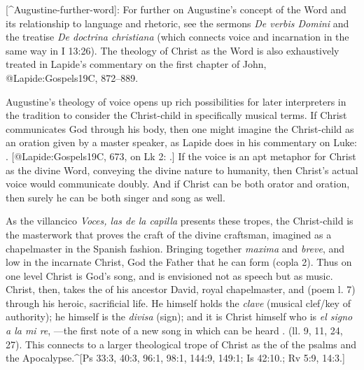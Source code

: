[^Augustine-further-word]:
For further on Augustine's concept of the Word and its relationship to language
and rhetoric, see the sermons \emph{De verbis Domini} and the treatise \emph{De doctrina
christiana} (which connects voice and incarnation in the same way in I 13:26).
The theology of Christ as the Word is also exhaustively treated in Lapide's
commentary on the first chapter of John, @Lapide:Gospels19C, 872--889.

Augustine's theology of voice opens up rich possibilities for later interpreters
in the tradition to consider the Christ-child in specifically musical terms.
If Christ communicates God through his body, then one might imagine the 
Christ-child as an oration given by a master speaker, as Lapide does in his
commentary on Luke:
. [@Lapide:Gospels19C, 673, on Lk 2:
.] 
If the voice is an apt metaphor for Christ as the divine Word, conveying the
divine nature to humanity, then Christ's actual voice would communicate doubly.
And if Christ can be both orator and oration, then surely he can be both singer
and song as well.

As the villancico \emph{Voces, las de la capilla} presents these tropes, the
Christ-child is the masterwork that proves the craft of the divine
craftsman, imagined as a chapelmaster in the Spanish fashion.
Bringing together \emph{maxima} and \emph{breve},  and low in the incarnate Christ,
God the Father  that he can form 
(copla 2).
Thus on one level Christ is God's song, and  is envisioned not as
speech but as music.
Christ, then, takes the  of his ancestor David, royal chapelmaster, and
 (poem l. 7) through his heroic, sacrificial life.
He himself holds the \emph{clave} (musical clef/key of authority); he himself is the
\emph{divisa} (sign); and it is Christ himself who is \emph{el signo a la mi
re}, ---the first note of a new song in which can be heard . (ll. 9, 11, 24, 27).
This connects to a larger theological trope of Christ as the  of
the psalms and the Apocalypse.^[Ps 33:3, 40:3, 96:1, 98:1, 144:9, 149:1; Is
42:10.; Rv 5:9, 14:3.]

